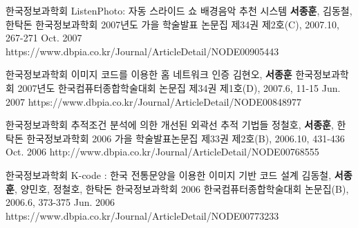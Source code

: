\begin{cventries}
  \cvpublicationentry
    {한국정보과학회} %
    {ListenPhoto: 자동 스라이드 쇼 배경음악 추천 시스템} %
    {\textbf{서종훈}, 김동철, 한탁돈} %
    {한국정보과학회 2007년도 가을 학술발표 논문집 제34권 제2호(C), 2007.10, 267-271}
    {Oct. 2007} %
    {https://www.dbpia.co.kr/Journal/ArticleDetail/NODE00905443}

  \cvpublicationentry
    {한국정보과학회} %
    {이미지 코드를 이용한 홈 네트워크 인증} %
    {김현오, \textbf{서종훈}} %
    {한국정보과학회 2007년도 한국컴퓨터종합학술대회 논문집 제34권 제1호(D), 2007.6, 11-15}
    {Jun. 2007} %
    {https://www.dbpia.co.kr/Journal/ArticleDetail/NODE00848977}

  \cvpublicationentry
    {한국정보과학회} %
    {추적조건 분석에 의한 개선된 외곽선 추적 기법들} %
    {정철호, \textbf{서종훈}, 한탁돈} %
    {한국정보과학회 2006 가을 학술발표논문집 제33권 제2호(B), 2006.10, 431-436}
    {Oct. 2006} %
    {http://www.dbpia.co.kr/Journal/ArticleDetail/NODE00768555}

  \cvpublicationentry
    {한국정보과학회} %
    {K-code : 한국 전통문양을 이용한 이미지 기반 코드 설계} %
    {김동철, \textbf{서종훈}, 양민호, 정철호, 한탁돈} %
    {한국정보과학회 2006 한국컴퓨터종합학술대회 논문집(B), 2006.6, 373-375}
    {Jun. 2006} %
    {https://www.dbpia.co.kr/Journal/ArticleDetail/NODE00773233}
\end{cventries}


